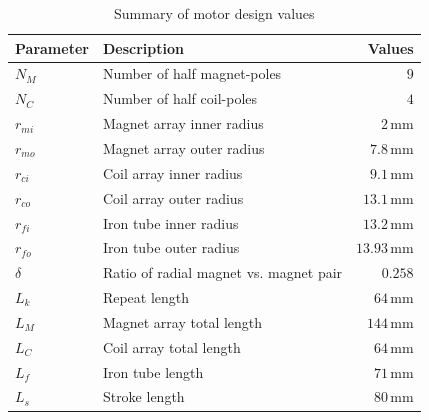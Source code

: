         
            \begin{table}[h]
            \renewcommand{\arraystretch}{1.2}
            \caption{Summary of motor design values}
            \label{table:chap/validation/construction/final_motor_design_params}
            \centering
                \begin{tabular}{llr}
                \hline
                \bfseries Parameter & \bfseries Description & \bfseries Values\\
                \hline
                    $N_M$			& Number of half magnet-poles			&	$9$\\
                    $N_C$			& Number of half coil-poles				&	$4$\\
                    $r_{mi}$		& Magnet array inner radius 			&	$2\,\mathrm{mm}$\\ 
                    $r_{mo}$		& Magnet array outer radius  			&	$7.8\,\mathrm{mm}$\\
                    $r_{ci}$		& Coil array inner radius				&	$9.1\,\mathrm{mm}$\\ 
                    $r_{co}$		& Coil array outer radius 				&	$13.1\,\mathrm{mm}$\\ 
                    $r_{fi}$		& Iron tube inner radius 				&	$13.2\,\mathrm{mm}$\\ 
                    $r_{fo}$		& Iron tube outer radius	 			&	$13.93\,\mathrm{mm}$\\ 
                    $\delta$		& Ratio of radial magnet vs. magnet pair	&	$0.258$\\ 
                \hline
                	$L_k$ 			& Repeat length 							&	$64\,\mathrm{mm}$\\
                	$L_M$			& Magnet array total length				&	$144\,\mathrm{mm}$\\ 
                	$L_C$			& Coil array total length				&	$64\,\mathrm{mm}$\\ 
                	$L_f$			& Iron tube length						&	$71\,\mathrm{mm}$\\ 
                    $L_s$			& Stroke length 						&	$80\,\mathrm{mm}$\\
                \hline
                \end{tabular}
            \end{table}
            
